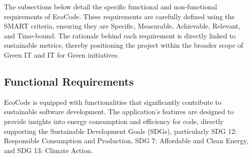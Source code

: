 \documentclass[conference,compsoc]{IEEEtran}
\begin{document}
The subsections below detail the specific functional and non-functional requirements of EcoCode. These requirements are carefully defined using the SMART criteria, ensuring they are Specific, Measurable, Achievable, Relevant, and Time-bound. The rationale behind each requirement is directly linked to sustainable metrics, thereby positioning the project within the broader scope of Green IT and IT for Green initiatives.

\subsection{Functional Requirements}
EcoCode is equipped with functionalities that significantly contribute to sustainable software development. The application's features are designed to provide insights into energy consumption and efficiency for  code, directly supporting the Sustainable Development Goals (SDGs), particularly SDG 12: Responsible Consumption and Production, SDG 7: Affordable and Clean Energy, and SDG 13: Climate Action.
\end{document}
